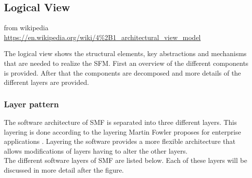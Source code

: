 \subsection{Logical View}
\label{subsec:logicalview}

{from wikipedia\\\url{https://en.wikipedia.org/wiki/4\%2B1_architectural_view_model}}

The logical view shows the structural elements, key abstractions and mechanisms that are needed to realize the SFM. First an overview of the different components is provided. After that the components are decomposed and more details of the different layers are provided.




%	

\subsubsection*{Layer pattern}
The software architecture of SMF is separated into three different layers. This layering is done according to the layering Martin Fowler proposes for enterprise applications \cite{Fowler:2002:PEA:579257,Fowler:web:servicelayer}.
Layering the software provides a more flexible architecture that allows modifications of layers having to alter the other layers.\\
The different software layers of SMF are listed below. Each of these layers will be discussed in more detail after the figure.

